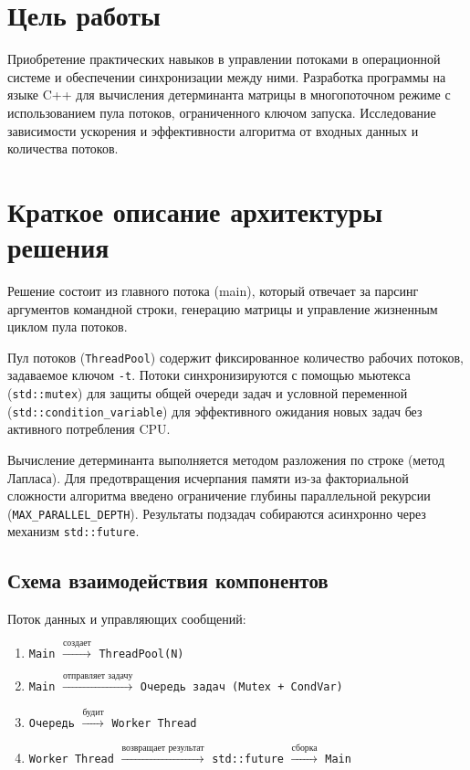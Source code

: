 \documentclass[12pt, a4paper]{article}
\begin{document}
\section{Цель работы}

Приобретение практических навыков в управлении потоками в операционной системе и обеспечении синхронизации между ними. Разработка программы на языке C++ для вычисления детерминанта матрицы в многопоточном режиме с использованием пула потоков, ограниченного ключом запуска. Исследование зависимости ускорения и эффективности алгоритма от входных данных и количества потоков.

\newpage

\section{Краткое описание архитектуры решения}

Решение состоит из главного потока (main), который отвечает за парсинг аргументов командной строки, генерацию матрицы и управление жизненным циклом пула потоков. 

Пул потоков (\texttt{ThreadPool}) содержит фиксированное количество рабочих потоков, задаваемое ключом \texttt{-t}. Потоки синхронизируются с помощью мьютекса (\texttt{std::mutex}) для защиты общей очереди задач и условной переменной (\texttt{std::condition\_variable}) для эффективного ожидания новых задач без активного потребления CPU.

Вычисление детерминанта выполняется методом разложения по строке (метод Лапласа). Для предотвращения исчерпания памяти из-за факториальной сложности алгоритма введено ограничение глубины параллельной рекурсии (\texttt{MAX\_PARALLEL\_DEPTH}). Результаты подзадач собираются асинхронно через механизм \texttt{std::future}.

\subsection{Схема взаимодействия компонентов}

Поток данных и управляющих сообщений:
\begin{enumerate}
    \item \texttt{Main} $\xrightarrow{\text{создает}}$ \texttt{ThreadPool(N)}
    \item \texttt{Main} $\xrightarrow{\text{отправляет задачу}}$ \texttt{Очередь задач (Mutex + CondVar)}
    \item \texttt{Очередь} $\xrightarrow{\text{будит}}$ \texttt{Worker Thread}
    \item \texttt{Worker Thread} $\xrightarrow{\text{возвращает результат}}$ \texttt{std::future} $\xrightarrow{\text{сборка}}$ \texttt{Main}
\end{enumerate}
\end{document}
